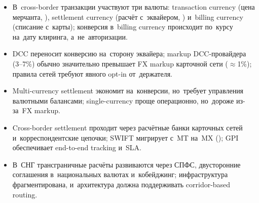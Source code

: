 \begin{itemize}
  \item В~cross-border транзакции участвуют три валюты:
        transaction currency (цена мерчанта, ),
        settlement currency (расчёт с~эквайером, )
        и~billing currency (списание с~карты); конверсия
        в~billing currency происходит по~курсу на~дату
        клиринга, а~не~авторизации.
  \item DCC переносит конверсию на~сторону эквайера;
        markup DCC-провайдера (3--7\%) обычно значительно
        превышает FX markup карточной сети ($\approx$1\%);
        правила сетей требуют явного opt-in от~держателя.
  \item Multi-currency settlement экономит на~конверсии,
        но~требует управления валютными балансами;
        single-currency проще операционно, но~дороже
        из-за~FX markup.
  \item Cross-border settlement проходит через расчётные
        банки карточных сетей и~корреспондентские цепочки;
        SWIFT мигрирует с~MT на~MX (); GPI
        обеспечивает end-to-end tracking и~SLA.
  \item В~СНГ трансграничные расчёты развиваются через
        СПФС, двусторонние соглашения в~национальных валютах
        и~кобейджинг; инфраструктура фрагментирована,
        и~архитектура должна поддерживать corridor-based
        routing.
\end{itemize}
